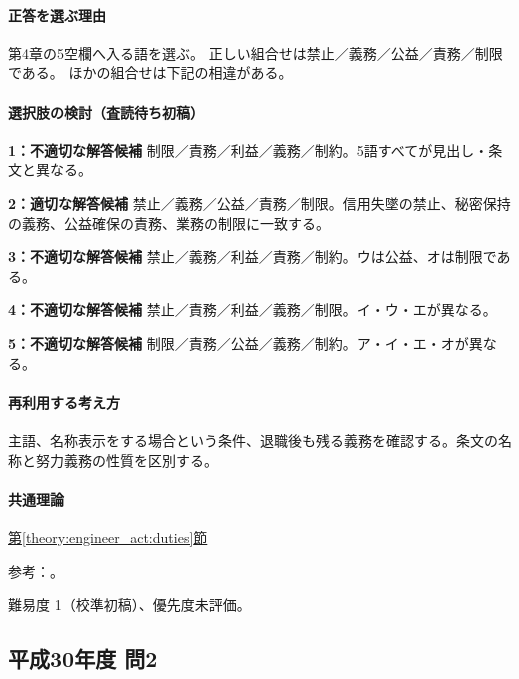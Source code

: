 \paragraph{正答を選ぶ理由} 第4章の5空欄へ入る語を選ぶ。 正しい組合せは禁止／義務／公益／責務／制限である。 ほかの組合せは下記の相違がある。

\paragraph{選択肢の検討（査読待ち初稿）}

\noindent\textbf{1：不適切な解答候補} 制限／責務／利益／義務／制約。5語すべてが見出し・条文と異なる。\par

\noindent\textbf{2：適切な解答候補} 禁止／義務／公益／責務／制限。信用失墜の禁止、秘密保持の義務、公益確保の責務、業務の制限に一致する。\par

\noindent\textbf{3：不適切な解答候補} 禁止／義務／利益／責務／制約。ウは公益、オは制限である。\par

\noindent\textbf{4：不適切な解答候補} 禁止／責務／利益／義務／制限。イ・ウ・エが異なる。\par

\noindent\textbf{5：不適切な解答候補} 制限／責務／公益／義務／制約。ア・イ・エ・オが異なる。\par

\paragraph{再利用する考え方} 主語、名称表示をする場合という条件、退職後も残る義務を確認する。条文の名称と努力義務の性質を区別する。

\paragraph{共通理論} \hyperref[theory:engineer_act:duties]{第\ref*{theory:engineer_act:duties}節}

\par 参考：\cite{engineer_act_current}。

\par 難易度 1（校準初稿）、優先度未評価。

\subsection{平成30年度 問2}
\label{q:h30-reg-apt-02}

